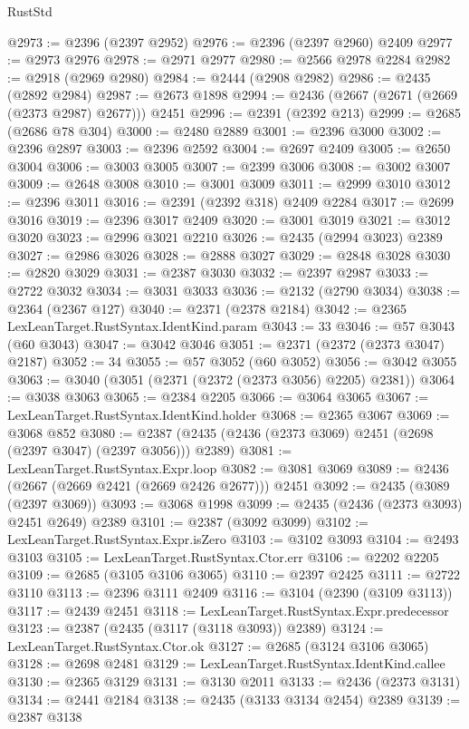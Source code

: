 \begin{lexlean}{RustStd}
\begin{coremodule}
@2973 := @2396 (@2397 @2952)
@2976 := @2396 (@2397 @2960) @2409
@2977 := @2973 @2976
@2978 := @2971 @2977
@2980 := @2566 @2978 @2284
@2982 := @2918 (@2969 @2980)
@2984 := @2444 (@2908 @2982)
@2986 := @2435 (@2892 @2984)
@2987 := @2673 @1898
@2994 := @2436 (@2667 (@2671 (@2669 (@2373 @2987) @2677))) @2451
@2996 := @2391 (@2392 @213)
@2999 := @2685 (@2686 @78 @304)
@3000 := @2480 @2889
@3001 := @2396 @3000
@3002 := @2396 @2897
@3003 := @2396 @2592
@3004 := @2697 @2409
@3005 := @2650 @3004
@3006 := @3003 @3005
@3007 := @2399 @3006
@3008 := @3002 @3007
@3009 := @2648 @3008
@3010 := @3001 @3009
@3011 := @2999 @3010
@3012 := @2396 @3011
@3016 := @2391 (@2392 @318) @2409 @2284
@3017 := @2699 @3016
@3019 := @2396 @3017 @2409
@3020 := @3001 @3019
@3021 := @3012 @3020
@3023 := @2996 @3021 @2210
@3026 := @2435 (@2994 @3023) @2389
@3027 := @2986 @3026
@3028 := @2888 @3027
@3029 := @2848 @3028
@3030 := @2820 @3029
@3031 := @2387 @3030
@3032 := @2397 @2987
@3033 := @2722 @3032
@3034 := @3031 @3033
@3036 := @2132 (@2790 @3034)
@3038 := @2364 (@2367 @127)
@3040 := @2371 (@2378 @2184)
@3042 := @2365 LexLeanTarget.RustSyntax.IdentKind.param
@3043 := 33
@3046 := @57 @3043 (@60 @3043)
@3047 := @3042 @3046
@3051 := @2371 (@2372 (@2373 @3047) @2187)
@3052 := 34
@3055 := @57 @3052 (@60 @3052)
@3056 := @3042 @3055
@3063 := @3040 (@3051 (@2371 (@2372 (@2373 @3056) @2205) @2381))
@3064 := @3038 @3063
@3065 := @2384 @2205
@3066 := @3064 @3065
@3067 := LexLeanTarget.RustSyntax.IdentKind.holder
@3068 := @2365 @3067
@3069 := @3068 @852
@3080 := @2387 (@2435 (@2436 (@2373 @3069) @2451 (@2698 (@2397 @3047) (@2397 @3056))) @2389)
@3081 := LexLeanTarget.RustSyntax.Expr.loop
@3082 := @3081 @3069
@3089 := @2436 (@2667 (@2669 @2421 (@2669 @2426 @2677))) @2451
@3092 := @2435 (@3089 (@2397 @3069))
@3093 := @3068 @1998
@3099 := @2435 (@2436 (@2373 @3093) @2451 @2649) @2389
@3101 := @2387 (@3092 @3099)
@3102 := LexLeanTarget.RustSyntax.Expr.isZero
@3103 := @3102 @3093
@3104 := @2493 @3103
@3105 := LexLeanTarget.RustSyntax.Ctor.err
@3106 := @2202 @2205
@3109 := @2685 (@3105 @3106 @3065)
@3110 := @2397 @2425
@3111 := @2722 @3110
@3113 := @2396 @3111 @2409
@3116 := @3104 (@2390 (@3109 @3113))
@3117 := @2439 @2451
@3118 := LexLeanTarget.RustSyntax.Expr.predecessor
@3123 := @2387 (@2435 (@3117 (@3118 @3093)) @2389)
@3124 := LexLeanTarget.RustSyntax.Ctor.ok
@3127 := @2685 (@3124 @3106 @3065)
@3128 := @2698 @2481
@3129 := LexLeanTarget.RustSyntax.IdentKind.callee
@3130 := @2365 @3129
@3131 := @3130 @2011
@3133 := @2436 (@2373 @3131)
@3134 := @2441 @2184
@3138 := @2435 (@3133 @3134 @2454) @2389
@3139 := @2387 @3138

\end{coremodule}
\end{lexlean}
